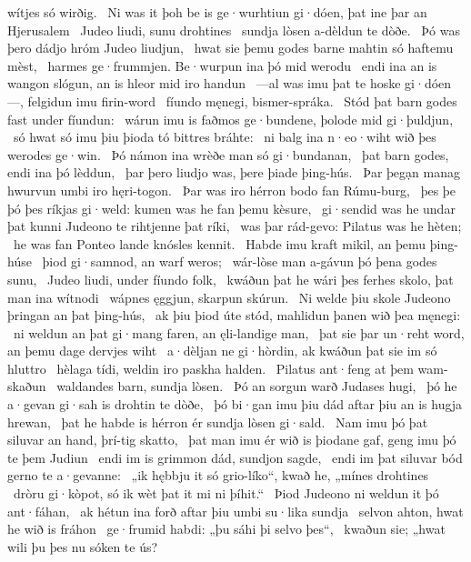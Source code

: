wítjes só wirðig. \hld\ Ni was it þoh be is ge·wurhtiun gi·dóen,
þat ine þar an Hjerusalem \hld\ Judeo liudi,
sunu drohtines \hld\ sundja lòsen
a-dèldun te dòðe. \hld\ Þó was þero dádjo hróm
Judeo liudjun, \hld\ hwat sie þemu godes barne mahtin
só haftemu mèst, \hld\ harmes ge·frummjen.
Be·wurpun ina þó mid werodu \hld\ endi ina an is wangon slógun,
an is hleor mid iro handun \hld\ —al was imu þat te hoske gi·dóen—,
felgidun imu firin-word \hld\ fíundo męnegi,
bismer-spráka. \hld\ Stód þat barn godes
fast under fíundun: \hld\ wárun imu is faðmos ge·bundene,
þolode mid gi·þuldjun, \hld\ só hwat só imu þiu þioda tó
bittres bráhte: \hld\ ni balg ina n·eo·wiht
wið þes werodes ge·win. \hld\ Þó námon ina wrèðe man
só gi·bundanan, \hld\ þat barn godes,
endi ina þó lèddun, \hld\ þar þero liudjo was,
þere þiade þing-hús. \hld\ Þar þegạn manag
hwurvun umbi iro hęri-togon. \hld\ Þar was iro hérron bodo
fan Rúmu-burg, \hld\ þes þe þó þes ríkjas gi·weld:
kumen was he fan þemu kèsure, \hld\ gi·sendid was he undar þat kunni Judeono
te rihtjenne þat ríki, \hld\ was þar rád-gevo:
Pilatus was he hèten; \hld\ he was fan Ponteo lande
knósles kennit. \hld\ Habde imu kraft mikil,
an þemu þing-húse \hld\ þiod gi·samnod,
an warf weros; \hld\ wár-lòse man
a-gávun þó þena godes sunu, \hld\ Judeo liudi,
under fíundo folk, \hld\ kwáðun þat he wári þes ferhes skolo,
þat man ina wítnodi \hld\ wápnes ęggjun,
skarpun skúrun. \hld\ Ni welde þiu skole Judeono
þringan an þat þing-hús, \hld\ ak þiu þiod úte stód,
mahlidun þanen wið þea męnegi: \hld\ ni weldun an þat gi·mang faren,
an ęli-landige man, \hld\ þat sie þar un·reht word,
an þemu dage dervjes wiht \hld\ a·dèljan ne gi·hòrdin,
ak kwáðun þat sie im só hluttro \hld\ hèlaga tídi,
weldin iro paskha halden. \hld\ Pilatus ant·feng
at þem wam-skaðun \hld\ waldandes barn,
sundja lòsen. \hld\ Þó an sorgun warð
Judases hugi, \hld\ þó he a·gevan gi·sah
is drohtin te dòðe, \hld\ þó bi·gan imu þiu dád aftar þiu
an is hugja hrewan, \hld\ þat he habde is hérron ér
sundja lòsen gi·sald. \hld\ Nam imu þó þat siluvar an hand,
þrí-tig skatto, \hld\ þat man imu ér wið is þiodane gaf,
geng imu þó te þem Judiun \hld\ endi im is grimmon dád,
sundjon sagde, \hld\ endi im þat siluvar bód
gerno te a·gevanne: \hld\ „ik hębbju it só grio-líko“, kwað he,
„mínes drohtines \hld\ dròru gi·kòpot,
só ik wèt þat it mi ni þíhit.“ \hld\ Þiod Judeono
ni weldun it þó ant·fáhan, \hld\ ak hétun ina forð aftar þiu
umbi su·lika sundja \hld\ selvon ahton,
hwat he wið is fráhon \hld\ ge·frumid habdi:
„þu sáhi þi selvo þes“, \hld\ kwaðun sie; „hwat wili þu þes nu sóken te ús?
